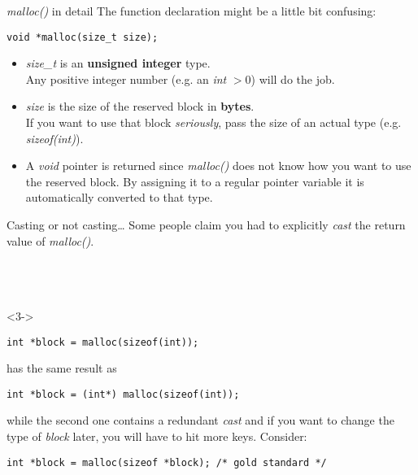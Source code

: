 
\begin{frame}[fragile]{\textit{malloc()} in detail}
	The function declaration might be a little bit confusing:
	\begin{lstlisting}[numbers=none]
void *malloc(size_t size);
\end{lstlisting}
	\begin{itemize}
		\item \textit{size\_t} is an \textbf{unsigned integer} type. \\
		Any positive integer number (e.g. an \textit{int} $>0$) will do the job.
		\item \textit{size} is the size of the reserved block in \textbf{bytes}. \\
		If you want to use that block \textit{seriously}, pass the size of an actual type (e.g. \textit{sizeof(int)}).
		\item A \textit{void} pointer is returned since \textit{malloc()} does not know how you want to use the reserved block. By assigning it to a regular pointer variable it is automatically converted to that type.
	\end{itemize}
\end{frame}


\begin{frame}[fragile]{Casting or not casting\dots}
	Some people claim you had to explicitly \textit{cast} the return value of \textit{malloc()}.\\
	\ \\
	 \ \\
	\ \\
	\begin{onlyenv}<3->
		\begin{lstlisting}[numbers=none]
int *block = malloc(sizeof(int));
\end{lstlisting}
	has the same result as
	\begin{lstlisting}[numbers=none]
int *block = (int*) malloc(sizeof(int));
\end{lstlisting}
	while the second one contains a redundant \textit{cast} and if you want to change the type of \textit{block} later, you will have to hit more keys. Consider:
	\begin{lstlisting}[numbers=none]
int *block = malloc(sizeof *block); /* gold standard */
\end{lstlisting}
	\end{onlyenv}
\end{frame}

